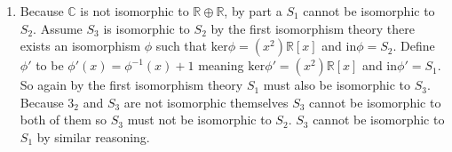 \documentclass[11pt] {article}
\newcommand{\C}{\mathbb{C}}
\newcommand{\R}{\mathbb{R}}
\begin{document}
\begin{enumerate}
\begin{enumerate}
		\item Because $\C$ is not isomorphic to $\R \oplus \R$, by part a $S_1$ cannot be isomorphic to $S_2$. Assume $S_3$ is isomorphic to $S_2$ by the first isomorphism theory there exists an isomorphism $\phi$ such that $\text{ker}\phi = (x^2)\R[x]$ and $\text{in}\phi = S_2$. Define $\phi'$ to be $\phi'(x) = \phi^{-1}(x) + 1$ meaning $\text{ker}\phi'= (x^2)\R[x]$ and $\text{in}\phi' = S_1$. So again by the first isomorphism theory $S_1$ must also be isomorphic to $S_3$. Because $3_2$ and $S_3$ are not isomorphic themselves $S_3$ cannot be isomorphic to both of them so $S_3$ must not be isomorphic to $S_2$. $S_3$ cannot be isomorphic to $S_1$ by similar reasoning. 
	\end{enumerate}
\end{enumerate}
\end{document}
